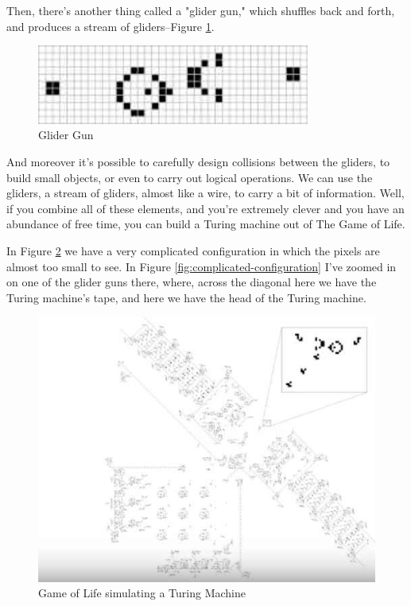 \documentclass[]{article}
\begin{document}
Then, there's another thing called a "glider gun," which shuffles back and forth, and produces a stream of gliders--Figure \ref{fig:glider-gun}.

\begin{figure}[H]
	\begin{center}
		\caption[Glider Gun]{Glider Gun\cite{wiki:glider:gun}}\label{fig:glider-gun}
		\includegraphics[width=0.8\textwidth]{glider-gun}
	\end{center}
\end{figure}

And moreover it's possible to carefully design collisions between the gliders, to build small objects, or even to carry out logical operations. We can use the gliders, a stream of gliders, almost like a wire, to carry a bit of information. Well, if you combine all of these elements, and you're extremely clever and you have an abundance of free time, you can build a Turing machine out of The Game of Life.

In Figure \ref{fig:gol-turing} we have a very complicated configuration in which the pixels are almost too small to see. In Figure \ref{fig:complicated-configuration} I've zoomed in on one of the glider guns there, where, across the diagonal here we have the Turing machine's tape, and here we have the head of the Turing machine.

\begin{figure}[H]
	\caption{Game of Life simulating a Turing Machine}\label{fig:gol-turing}
	\includegraphics[width=\textwidth]{gol-turing}
\end{figure}
\end{document}
